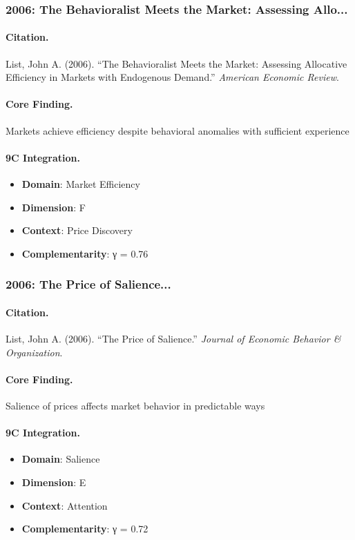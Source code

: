 \subsubsection{2006: The Behavioralist Meets the Market: Assessing Allo...}

\paragraph{Citation.}
List, John A. (2006). ``The Behavioralist Meets the Market: Assessing Allocative Efficiency in Markets with Endogenous Demand.''
\textit{American Economic Review}.

\paragraph{Core Finding.}
Markets achieve efficiency despite behavioral anomalies with sufficient experience

\paragraph{9C Integration.}
\begin{itemize}[nosep]
  \item \textbf{Domain}: Market Efficiency
  \item \textbf{Dimension}: F
  \item \textbf{Context}: Price Discovery
  \item \textbf{Complementarity}: γ = 0.76
\end{itemize}


\subsubsection{2006: The Price of Salience...}

\paragraph{Citation.}
List, John A. (2006). ``The Price of Salience.''
\textit{Journal of Economic Behavior & Organization}.

\paragraph{Core Finding.}
Salience of prices affects market behavior in predictable ways

\paragraph{9C Integration.}
\begin{itemize}[nosep]
  \item \textbf{Domain}: Salience
  \item \textbf{Dimension}: E
  \item \textbf{Context}: Attention
  \item \textbf{Complementarity}: γ = 0.72
\end{itemize}


